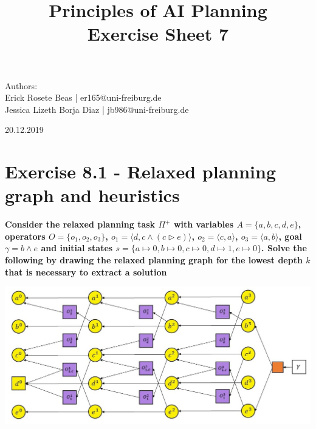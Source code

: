 \documentclass[12pt,a4paper]{article}
\title{\textbf{Principles of AI Planning
		\\{\Large Exercise Sheet 7}}}
\begin{document}
\begin{flushleft}
	Authors:\\
	Erick Rosete Beas | er165@uni-freiburg.de\\
	Jessica Lizeth Borja Diaz | jb986@uni-freiburg.de\\
\end{flushleft}
{\let\newpage\relax\maketitle}
\begin{center} 
	\large 20.12.2019 
\end{center}


\section*{Exercise 8.1 - Relaxed planning graph and heuristics}
\textbf{Consider the relaxed planning task $\Pi^+$ with variables 
$A=\{a,b,c,d,e\}$, operators $O=\{o_1,o_2,o_3\}$, $o_1=\langle d, c \land (c \triangleright e)\rangle$,
$o_2= \langle c , a \rangle$, $o_3= \langle a, b\rangle$, goal
$\gamma = b \land e$ and initial states $s=\{ a\mapsto 0, 
b\mapsto 0, c \mapsto 0, d \mapsto 1, e \mapsto 0 \}$. Solve the following
by drawing the relaxed planning graph for the lowest depth $k$
that is necessary to extract a solution}
\begin{center}
	\includegraphics[scale=0.5]{img1.jpg}\\
\end{center}
\end{document}
